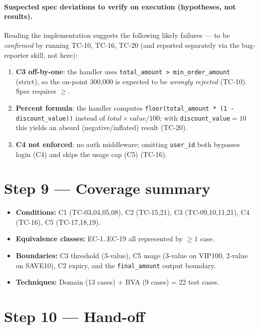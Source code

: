 \documentclass[11pt,a4paper]{article}
\newcommand{\code}[1]{\texttt{#1}}
\begin{document}
\paragraph{Suspected spec deviations to verify on execution (hypotheses, not results).}
Reading the implementation suggests the following likely failures --- to be
\emph{confirmed} by running TC-10, TC-16, TC-20 (and reported separately via the
bug-reporter skill, not here):
\begin{enumerate}[leftmargin=1.4em,nosep]
  \item \textbf{C3 off-by-one}: the handler uses \code{total\_amount > min\_order\_amount}
        (strict), so the on-point 300{,}000 is expected to be \emph{wrongly rejected}
        (TC-10). Spec requires $\ge$.
  \item \textbf{Percent formula}: the handler computes
        \code{floor(total\_amount * (1 - discount\_value))} instead of
        $total\times value/100$; with \code{discount\_value}$=10$ this yields an
        absurd (negative/inflated) result (TC-20).
  \item \textbf{C4 not enforced}: no auth middleware; omitting \code{user\_id} both
        bypasses login (C4) and skips the usage cap (C5) (TC-16).
\end{enumerate}

\section{Step 9 --- Coverage summary}

\begin{itemize}[nosep]
  \item \textbf{Conditions:} C1 (TC-03,04,05,08), C2 (TC-15,21), C3 (TC-09,10,11,21),
        C4 (TC-16), C5 (TC-17,18,19).
  \item \textbf{Equivalence classes:} EC-1..EC-19 all represented by $\ge 1$ case.
  \item \textbf{Boundaries:} C3 threshold (3-value), C5 usage (3-value on VIP100,
        2-value on SAVE10), C2 expiry, and the \code{final\_amount} output boundary.
  \item \textbf{Techniques:} Domain (13 cases) + BVA (9 cases) = 22 test cases.
\end{itemize}

\section{Step 10 --- Hand-off}
\end{document}
